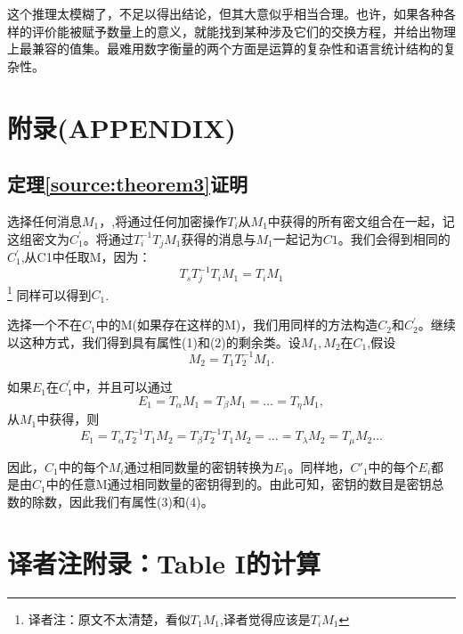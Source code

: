 \documentclass[]{article}
\begin{document}
这个推理太模糊了，不足以得出结论，但其大意似乎相当合理。也许，如果各种各样的评价能被赋予数量上的意义，就能找到某种涉及它们的交换方程，并给出物理上最兼容的值集。最难用数字衡量的两个方面是运算的复杂性和语言统计结构的复杂性。

\newpage
%   
%
\section*{附录(APPENDIX)}

\subsection*{定理\ref{source:theorem3}证明}
选择任何消息$M_1$，,将通过任何加密操作$T_i$从$M_1$中获得的所有密文组合在一起，记这组密文为$C_1^{'}$。将通过$T_i^{-1}T_jM_1$获得的消息与$M_1$一起记为$C1$。我们会得到相同的$C_1^{'}$,从C1中任取M，因为：
\[T_sT_j^{-1}T_iM_1=T_iM_1\]\footnote{译者注：原文不太清楚，看似$T_1M_1$,译者觉得应该是$T_iM_1$}
同样可以得到$C_1$.

选择一个不在$C_1$中的M(如果存在这样的M)，我们用同样的方法构造$C_2$和$C_2^{'}$。继续以这种方式，我们得到具有属性(1)和(2)的剩余类。设$M_1,M_2$在$C_1$,假设
\[M_2=T_1T_2^{-1}M_1.\]

如果$E_1$在$C_1^{'}$中，并且可以通过
\[E_1=T_{\alpha}M_1 =T_{\beta}M_1= \ldots=T_{\eta}M_1, \]
从$M_1$中获得，则
\[E_1=T_{\alpha}T_2^{-1}T_1M_2 = T_{\beta}T_2^{-1}T_1M_2 = \ldots =T_{\lambda}M_2 = T_{\mu}M_2\ldots\]


因此，$C_1$中的每个$M_i$通过相同数量的密钥转换为$E_1$。同样地，$C'_1$中的每个$E_i$都是由$C_1$中的任意M通过相同数量的密钥得到的。由此可知，密钥的数目是密钥总数的除数，因此我们有属性(3)和(4)。

\newpage
%   
%

\section*{译者注附录：Table I的计算}\label{app:table1}
\end{document}
